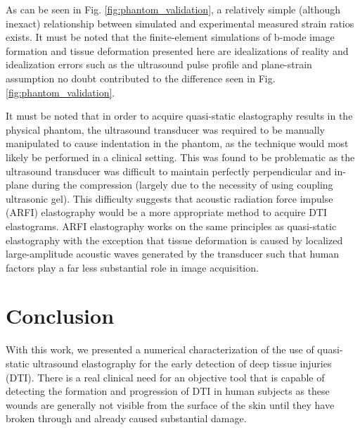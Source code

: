 			As can be seen in Fig. \ref{fig:phantom_validation}, a relatively simple (although inexact) relationship between simulated and experimental measured strain ratios exists. It must be noted that the finite-element simulations of b-mode image formation and tissue deformation presented here are idealizations of reality and idealization errors such as the ultrasound pulse profile and plane-strain assumption no doubt contributed to the difference seen in Fig. \ref{fig:phantom_validation}.

			It must be noted that in order to acquire quasi-static elastography results in the physical phantom, the ultrasound transducer was required to be manually manipulated to cause indentation in the phantom, as the technique would most likely be performed in a clinical setting. This was found to be problematic as the ultrasound transducer was difficult to maintain perfectly perpendicular and in-plane during the compression (largely due to the necessity of using coupling ultrasonic gel). This difficulty suggests that acoustic radiation force impulse (ARFI) elastography would be a more appropriate method to acquire DTI elastograms. ARFI elastography works on the same principles as quasi-static elastography with the exception that tissue deformation is caused by localized large-amplitude acoustic waves generated by the transducer such that human factors play a far less substantial role in image acquisition.

	\section{Conclusion}
		With this work, we presented a numerical characterization of the use of quasi-static ultrasound elastography for the early detection of deep tissue injuries (DTI). There is a real clinical need for an objective tool that is capable of detecting the formation and progression of DTI in human subjects as these wounds are generally not visible from the surface of the skin until they have broken through and already caused substantial damage.

